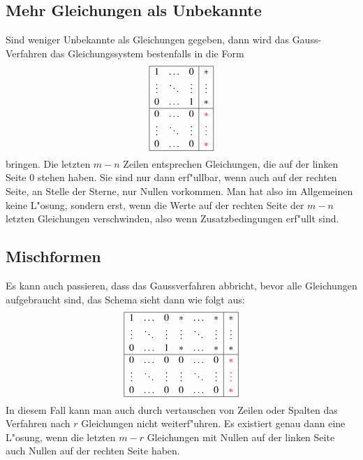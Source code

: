 \subsection{Mehr Gleichungen als Unbekannte}
Sind weniger Unbekannte als Gleichungen gegeben, dann wird das Gauss-Verfahren
das Gleichungssystem bestenfalls in die Form
\[
\begin{array}{|ccc|c|}
\hline
1&\dots&0&*\\
\vdots&\ddots&\vdots&\vdots\\
0&\dots&1&*\\
\hline
0&\dots&0&\color{red}*\\
\vdots&\ddots&\vdots&\color{red}\vdots\\
0&\dots&0&\color{red}*\\
\hline
\end{array}
\]
bringen.
Die letzten $m-n$ Zeilen entsprechen Gleichungen, die auf
der linken Seite $0$ stehen haben.
Sie sind nur dann erf"ullbar, wenn
auch auf der rechten Seite, an Stelle der Sterne, nur Nullen vorkommen.
Man hat also im Allgemeinen keine L"osung, sondern erst, wenn die Werte
auf der rechten Seite der $m-n$ letzten Gleichungen verschwinden,
also wenn Zusatzbedingungen erf"ullt sind.

\subsection{Mischformen}
Es kann auch passieren, dass das Gaussverfahren abbricht, bevor alle
Gleichungen aufgebraucht sind, das Schema sieht dann wie folgt aus:
\begin{equation}
\begin{array}{|cccccc|c|}
\hline
1&\dots&0 &*&\dots&*&*\\
\vdots&\ddots&\vdots &\vdots&\ddots&\vdots&\vdots\\
0&\dots&1 &*&\dots&*&*\\
\hline
0&\dots&0 &0&\dots&0&\color{red}*\\
\vdots&\ddots&\vdots &\vdots&\ddots&\vdots&\color{red}\vdots\\
0&\dots&0 &0&\dots&0&\color{red}*\\
\hline
\end{array}
\label{rangdef}
\end{equation}
In diesem Fall kann man auch durch vertauschen von Zeilen oder Spalten
das Verfahren nach $r$ Gleichungen nicht weiterf"uhren.
Es existiert genau dann eine L"osung, wenn die letzten $m-r$ Gleichungen
mit Nullen auf der linken Seite auch Nullen auf der
rechten Seite haben.

